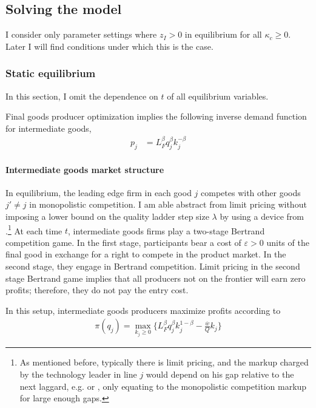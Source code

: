 \documentclass[12pt,english]{article}
\theoremstyle{remark}
\begin{document}
\subsection{Solving the model}

I consider only parameter settings where $z_I > 0$ in equilibrium for all $\kappa_c \ge 0$. Later I will find conditions under which this is the case.

\subsubsection{Static equilibrium}

In this section, I omit the dependence on $t$ of all equilibrium variables. 

Final goods producer optimization implies the following inverse demand function for intermediate goods, 
\begin{align*}
p_j &= L_F^{\beta} q_j^{\beta} k_j^{-\beta}	
\end{align*}

\paragraph{Intermediate goods market structure} In equilibrium, the leading edge firm in each good $j$ competes with other goods $j' \ne j$ in monopolistic competition. I am able abstract from limit pricing without imposing a lower bound on the quality ladder step size $\lambda$ by using a device from \cite{akcigit_growth_2018}.\footnote{As mentioned before, typically there is limit pricing, and the markup charged by the technology leader in line $j$ would depend on his gap relative to the next laggard, e.g. \cite{baslandze_spinout_2019} or \cite{aghion_competition_2005}, only equating to the monopolistic competition markup for large enough gaps.} At each time $t$, intermediate goods firms play a two-stage Bertrand competition game. In the first stage, participants bear a cost of $\varepsilon > 0$ units of the final good in exchange for a right to compete in the product market. In the second stage, they engage in Bertrand competition. Limit pricing in the second stage Bertrand game implies that all producers not on the frontier will earn zero profits; therefore, they do not pay the entry cost. 

In this setup, intermediate goods producers maximize profits according to
\begin{align}
\pi(q_j) = \max_{k_j \ge 0} \Big\{ L_F^{\beta} q_j^{\beta} k_j^{1-\beta} - \frac{\overline{w}}{Q} k_j \Big\} \label{incumbent_profit}
\end{align}
\end{document}
